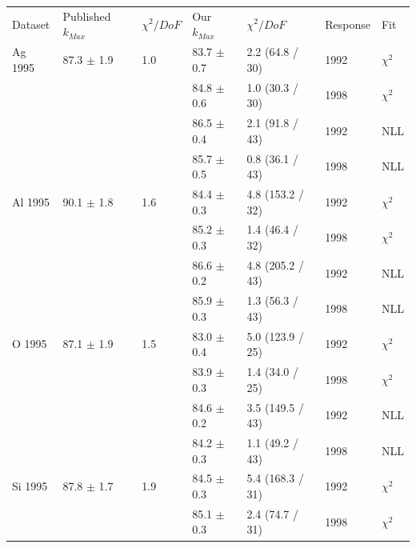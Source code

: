 \begin{table}[H]
  \begin{center}
    \begin{tabular}{|l||l|l|l|l|l|l|}
      \hline
      Dataset & Published $k_{Max}$ & $\chi^2 / DoF$ & Our $k_{Max}$ & $\chi^2 / DoF$  & Response & Fit \\
      \hhline{|=||=|=|=|=|=|=|}
       Ag 1995   & 87.3 $\pm$ 1.9 & 1.0 &83.7 $\pm$ 0.7 & 2.2 (64.8 / 30)  & 1992 & $\chi^2$ \\  
                 &                &     &84.8 $\pm$ 0.6 & 1.0 (30.3 / 30)  & 1998 & $\chi^2$ \\  
                                                                            
                &                &     & 86.5 $\pm$ 0.4 & 2.1 (91.8 / 43) & 1992 & NLL \\
                &                &     & 85.7 $\pm$ 0.5 & 0.8 (36.1 / 43) & 1998 & NLL \\      
      \hline                                                               
       Al 1995   & 90.1 $\pm$ 1.8 & 1.6 &84.4 $\pm$ 0.3 & 4.8 (153.2 / 32) & 1992 & $\chi^2$ \\  
                 &                &     &85.2 $\pm$ 0.3 & 1.4 (46.4 / 32)  & 1998 & $\chi^2$ \\  
                                                                           
                &                &     & 86.6 $\pm$ 0.2 & 4.8 (205.2 / 43) & 1992 & NLL \\
                &                &     & 85.9 $\pm$ 0.3 & 1.3 (56.3 / 43) & 1998 & NLL \\
      \hline                                                               
       O 1995    & 87.1 $\pm$ 1.9 & 1.5 &83.0 $\pm$ 0.4 & 5.0 (123.9 / 25) & 1992 & $\chi^2$ \\  
                 &                &     &83.9 $\pm$ 0.3 & 1.4 (34.0 / 25)  & 1998 & $\chi^2$ \\  
                                                                           
                &                &     & 84.6 $\pm$ 0.2 & 3.5 (149.5 / 43)& 1992 & NLL\\
                &                &     & 84.2 $\pm$ 0.3 & 1.1 (49.2 / 43) & 1998 & NLL\\
      \hline                                                                    
       Si 1995   & 87.8 $\pm$ 1.7 & 1.9 &84.5 $\pm$ 0.3 & 5.4 (168.3 / 31) & 1992 & $\chi^2$ \\  
                 &                &     &85.1 $\pm$ 0.3 & 2.4 (74.7 / 31)  & 1998 & $\chi^2$ \\  
                                                                            

\end{tabular}
\end{center}
\end{table}
